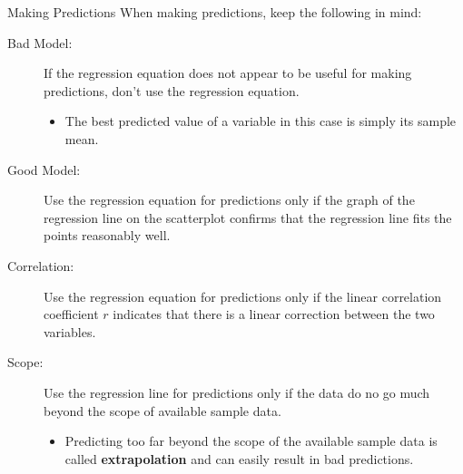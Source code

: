 \documentclass{beamer}
\begin{document}
\begin{frame}
\begin{block}{Making Predictions}
When making predictions, keep the following in mind:
\begin{description}
\item[Bad Model:] If the regression equation does not appear to be useful for making predictions, don't use the regression equation.\pause
\begin{itemize}
\item The best predicted value of a variable in this case is simply its sample mean.
\end{itemize}\pause
\item[Good Model:] Use the regression equation for predictions only if the graph of the regression line on the scatterplot confirms that the regression line fits the points reasonably well.\pause
\item[Correlation:] Use the regression equation for predictions only if the linear correlation coefficient $r$ indicates that there is a linear correction between the two variables.\pause
\item[Scope:] Use the regression line for predictions only if the data do no go much beyond the scope of available sample data.\pause
\begin{itemize}
\item Predicting too far beyond the scope of the available sample data is called \textbf{extrapolation} and can easily result in bad predictions.
\end{itemize}
\end{description}
\end{block}
\end{frame}
\end{document}
